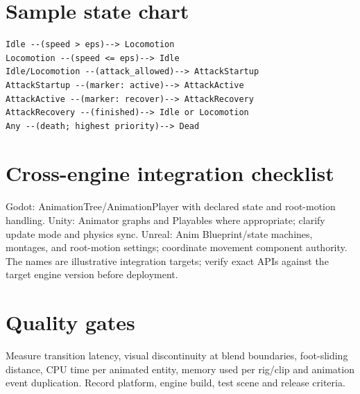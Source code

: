 \documentclass[10pt,letterpaper]{article}
\begin{document}
\section{Sample state chart}
\begin{verbatim}
Idle --(speed > eps)--> Locomotion
Locomotion --(speed <= eps)--> Idle
Idle/Locomotion --(attack_allowed)--> AttackStartup
AttackStartup --(marker: active)--> AttackActive
AttackActive --(marker: recover)--> AttackRecovery
AttackRecovery --(finished)--> Idle or Locomotion
Any --(death; highest priority)--> Dead
\end{verbatim}
\section{Cross-engine integration checklist}
Godot: AnimationTree/AnimationPlayer with declared state and root-motion handling. Unity: Animator graphs and Playables where appropriate; clarify update mode and physics sync. Unreal: Anim Blueprint/state machines, montages, and root-motion settings; coordinate movement component authority. The names are illustrative integration targets; verify exact APIs against the target engine version before deployment.
\section{Quality gates}
Measure transition latency, visual discontinuity at blend boundaries, foot-sliding distance, CPU time per animated entity, memory used per rig/clip and animation event duplication. Record platform, engine build, test scene and release criteria.
\end{document}
